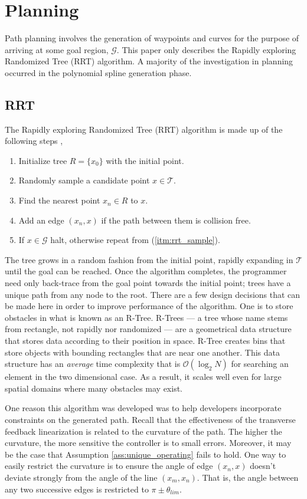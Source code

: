 \documentclass[oneside, 11pt]{book}
\begin{document}
\chapter{Planning}\label{sec:planning}
Path planning involves the generation of waypoints and curves for the purpose of arriving at some goal region, $\mathcal{G}$. This paper only describes the Rapidly exploring Randomized Tree (RRT) algorithm. A majority of the investigation in planning occurred in the polynomial spline generation phase.

\section{RRT}
The Rapidly exploring Randomized Tree (RRT) algorithm is made up of the following steps \cite{Karaman11},
\begin{enumerate}
    \item Initialize tree $R=\{ x_0 \}$ with the initial point.
    \item Randomly sample a candidate point $x \in \mathcal{T}$.\label{itm:rrt_sample}
    \item Find the nearest point $x_n\in R$ to $x$.
    \item Add an edge $(x_n, x)$ if the path between them is collision free.
    \item If $x\in\mathcal{G}$ halt, otherwise repeat from (\ref{itm:rrt_sample}).
\end{enumerate}
The tree grows in a random fashion from the initial point, rapidly expanding in $\mathcal{T}$ until the goal can be reached. Once the algorithm completes, the programmer need only back-trace from the goal point towards the initial point; trees have a unique path from any node to the root. There are a few design decisions that can be made here in order to improve performance of the algorithm. One is to store obstacles in what is known as an R-Tree. R-Trees --- a tree whose name stems from rectangle, not rapidly nor randomized --- are a geometrical data structure that stores data according to their position in space. R-Tree creates bins that store objects with  bounding rectangles that are near one another. This data structure has an \emph{average} time complexity that is $\mathcal{O}(\log_2 N)$ for searching an element in the two dimensional case. As a result, it scales well even for large spatial domains where many obstacles may exist.

One reason this algorithm was developed was to help developers incorporate constraints on the generated path. Recall that the effectiveness of the transverse feedback linearization is related to the curvature of the path. The higher the curvature, the more sensitive the controller is to small errors. Moreover, it may be the case that Assumption \ref{ass:unique_operating} fails to hold. One way to easily restrict the curvature is to ensure the angle of edge $(x_n, x)$ doesn't deviate strongly from the angle of the line $(x_m, x_n)$. That is, the angle between any two successive edges is restricted to $\pi\pm\theta_{lim}$.
\end{document}
